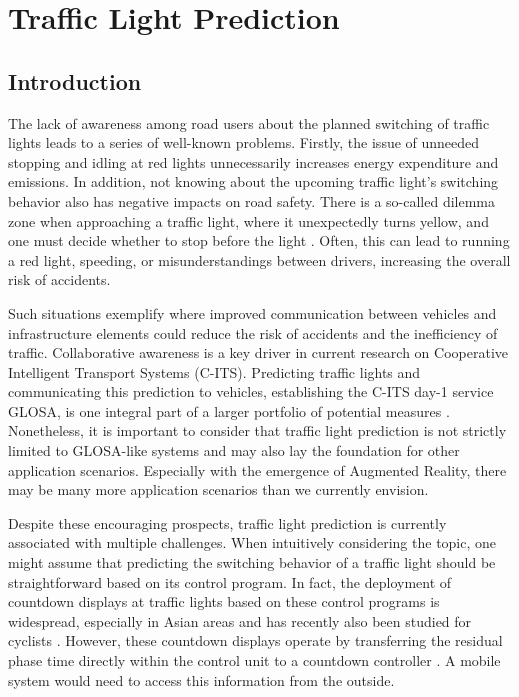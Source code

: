 \chapter{Traffic Light Prediction}\label{ch:prediction}

 \section{Introduction}

The lack of awareness among road users about the planned switching of traffic lights leads to a series of well-known problems. Firstly, the issue of unneeded stopping and idling at red lights unnecessarily increases energy expenditure and emissions. In addition, not knowing about the upcoming traffic light's switching behavior also has negative impacts on road safety. There is a so-called dilemma zone when approaching a traffic light, where it unexpectedly turns yellow, and one must decide whether to stop before the light \cite{zhang_yellow_2014}. Often, this can lead to running a red light, speeding, or misunderstandings between drivers, increasing the overall risk of accidents.

Such situations exemplify where improved communication between vehicles and infrastructure elements could reduce the risk of accidents and the inefficiency of traffic. Collaborative awareness is a key driver in current research on Cooperative Intelligent Transport Systems (C-ITS). Predicting traffic lights and communicating this prediction to vehicles, establishing the C-ITS day-1 service GLOSA, is one integral part of a larger portfolio of potential measures \cite{mellegard_day_2020}. Nonetheless, it is important to consider that traffic light prediction is not strictly limited to GLOSA-like systems and may also lay the foundation for other application scenarios. Especially with the emergence of Augmented Reality, there may be many more application scenarios than we currently envision.

Despite these encouraging prospects, traffic light prediction is currently associated with multiple challenges. When intuitively considering the topic, one might assume that predicting the switching behavior of a traffic light should be straightforward based on its control program. In fact, the deployment of countdown displays at traffic lights based on these control programs is widespread, especially in Asian areas \cite{pan_impact_2023} and has recently also been studied for cyclists \cite{kaths_green_2019}. However, these countdown displays operate by transferring the residual phase time directly within the control unit to a countdown controller \cite{islam_improved_2016}. A mobile system would need to access this information from the outside.

